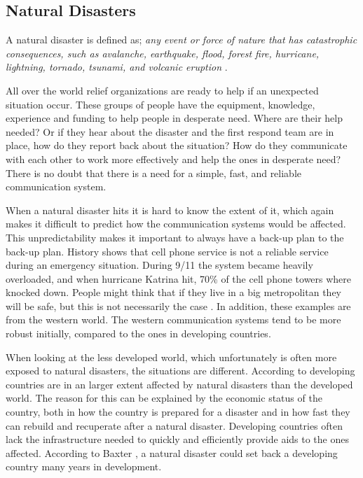 \subsection{Natural Disasters}
A natural disaster is defined as; \textit{any event or force of nature that has catastrophic consequences, such as avalanche, earthquake, flood, forest fire, hurricane, lightning, tornado, tsunami, and volcanic eruption} \cite{naturalDisaster}.

All over the world relief organizations are ready to help if an unexpected situation occur. These groups of people have the equipment, knowledge, experience and funding to help people in desperate need. Where are their help needed? Or if they hear about the disaster and the first respond team are in place, how do they report back about the situation? How do they communicate with each other to work more effectively and help the ones in desperate need? There is no doubt that there is a need for a simple, fast, and reliable communication system.

When a natural disaster hits it is hard to know the extent of it, which  again makes it difficult to predict how the communication systems would be affected. This unpredictability makes it important to always have a back-up plan to the back-up plan. History shows that cell phone service is not a reliable service during an emergency situation. During 9/11 the system became heavily overloaded, and when hurricane Katrina hit, 70\% of the cell phone towers where knocked down. People might think that if they live in a big metropolitan they will be safe, but this is not necessarily the case \cite{disasterComm}. In addition, these examples are from the western world. The western communication systems tend to be more robust initially, compared to the ones in developing countries. 

When looking at the less developed world, which unfortunately is often more exposed to natural disasters, the situations are different. According to \cite{DevelopingWorld, 360} developing countries are in an larger extent affected by natural disasters than the developed world. The reason for this can be explained by the economic status of the country, both in how the country is prepared for a disaster and in how fast they can rebuild and recuperate after a natural disaster. Developing countries often lack the infrastructure needed to quickly and efficiently provide aids to the ones affected. According to Baxter \cite{360}, a natural disaster could set back a developing country many years in development.  

